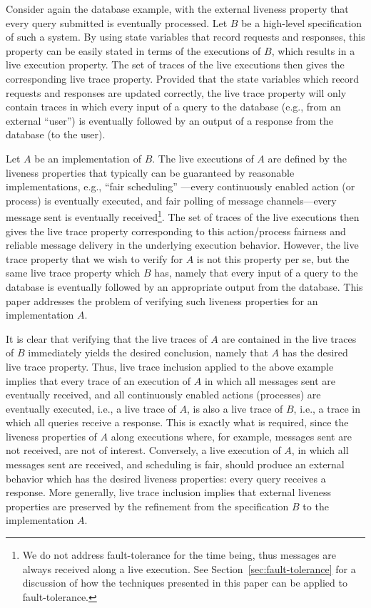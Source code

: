 \documentclass[11pt]{article}
\begin{document}
Consider again the database example, with the external liveness property that
every query submitted is eventually processed.  Let $B$ be a
high-level specification of such a system.  By using state variables
that record requests and responses, this property can be easily stated
in terms of the executions of $B$, which results in a live execution
property.  The set of traces of the live executions then gives the
corresponding live trace property. Provided that the state variables
which record requests and responses are updated correctly, the live
trace property will only contain traces in which every input of a
query to the database (e.g., from an external ``user'') is eventually
followed by an output of a response from the database (to the user).

Let $A$ be an implementation of $B$. The live executions of $A$ are
defined by the liveness properties that typically can be guaranteed by
reasonable implementations, e.g., ``fair scheduling''
\cite{Fr86}---every continuously enabled action (or process) is
eventually executed, and fair polling of message channels---every
message sent is eventually received\footnote{We do not address
fault-tolerance for the time being, thus messages are always received
along a live execution. See Section~\ref{sec:fault-tolerance} for a
discussion of how the techniques presented in this paper can be
applied to fault-tolerance.}.
The set of traces of the live executions then gives the 
live trace property corresponding to this action/process fairness and
reliable message delivery in the underlying execution behavior.
However, the live trace property that we wish to verify for $A$ is not
this property per se, but the same live trace property which $B$ has, namely that
every input of a query to
the database is eventually followed by an appropriate output from the database.
This paper addresses the problem of verifying such liveness properties
for an implementation  $A$.

It is clear that verifying that the live traces of $A$ are contained
in the live traces of $B$ immediately yields the desired conclusion,
namely that $A$ has the desired live trace property.
Thus, live trace inclusion applied to the above example implies that
every trace of an execution of $A$ in which all messages sent are
eventually received, and all continuously enabled actions (processes)
are eventually executed, i.e., a live trace of $A$, is also a live
trace of $B$, i.e., a trace in which all queries receive a response. This
is exactly what is required, since the liveness properties of $A$
along executions where, for example, messages sent are not received,
are not of interest. Conversely, a live execution of $A$, in which all
messages sent are received, and scheduling is fair, should produce an
external behavior which has the desired liveness properties:
every query receives a response.
More generally, live trace inclusion 
implies that external liveness properties are
preserved by the refinement from the specification $B$ to the implementation
$A$.
\end{document}
